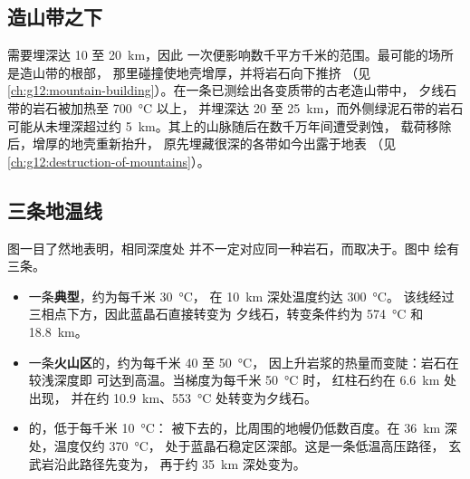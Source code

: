 \subsection{造山带之下}

需要埋深达 10 至 \qty{20}{km}，因此
一次便影响数千平方千米的范围。最可能的场所是造山带的根部，
那里碰撞使地壳增厚，并将岩石向下推挤
（见\cref{ch:g12:mountain-building}）。在一条已测绘出各变质带的古老造山带中，
夕线石带的岩石被加热至 \qty{700}{\celsius} 以上，
并埋深达 20 至 \qty{25}{km}，而外侧绿泥石带的岩石
可能从未埋深超过约 \qty{5}{km}。其上的山脉随后在数千万年间遭受剥蚀，
载荷移除后，增厚的地壳重新抬升，
原先埋藏很深的各带如今出露于地表
（见\cref{ch:g12:destruction-of-mountains}）。

\subsection{三条地温线}

图一目了然地表明，相同深度处
并不一定对应同一种岩石，而取决于。图中
绘有三条。

\begin{itemize}
  \item 一条\textbf{典型}，约为每千米 \qty{30}{\celsius}，
        在 \qty{10}{km} 深处温度约达 \qty{300}{\celsius}。
        该线经过三相点下方，因此蓝晶石直接转变为
        夕线石，转变条件约为 \qty{574}{\celsius} 和
        \qty{18.8}{km}。
  \item 一条\textbf{火山区}的，约为每千米 40 至 \qty{50}{\celsius}，
        因上升岩浆的热量而变陡：岩石在较浅深度即
        可达到高温。当梯度为每千米 \qty{50}{\celsius} 时，
        红柱石约在 \qty{6.6}{km} 处出现，
        并在约 \qty{10.9}{km}、\qty{553}{\celsius} 处转变为夕线石。
  \item \textbf{}的，低于每千米 \qty{10}{\celsius}：
        被下去的，比周围的地幔仍低数百度。在
        \qty{36}{km} 深处，温度仅约 \qty{370}{\celsius}，
        处于蓝晶石稳定区深部。这是一条低温高压路径，
        玄武岩沿此路径先变为，
        再于约 \qty{35}{km} 深处变为。
\end{itemize}


